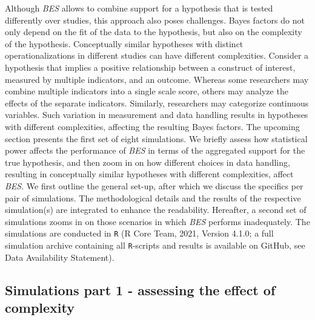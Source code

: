 \documentclass[
]{interact}
\begin{document}
Although \emph{BES} allows to combine support for a hypothesis that is
tested differently over studies, this approach also poses challenges.
Bayes factors do not only depend on the fit of the data to the
hypothesis, but also on the complexity of the hypothesis. Conceptually
similar hypotheses with distinct operationalizations in different
studies can have different complexities. Consider a hypothesis that
implies a positive relationship between a construct of interest,
measured by multiple indicators, and an outcome. Whereas some
researchers may combine multiple indicators into a single scale score,
others may analyze the effects of the separate indicators. Similarly,
researchers may categorize continuous variables. Such variation in
measurement and data handling results in hypotheses with different
complexities, affecting the resulting Bayes factors. The upcoming
section presents the first set of eight simulations. We briefly assess
how statistical power affects the performance of \emph{BES} in terms of
the aggregated support for the true hypothesis, and then zoom in on how
different choices in data handling, resulting in conceptually similar
hypotheses with different complexities, affect \emph{BES}. We first
outline the general set-up, after which we discuss the specifics per
pair of simulations. The methodological details and the results of the
respective simulation(s) are integrated to enhance the readability.
Hereafter, a second set of simulations zooms in on those scenarios in
which \emph{BES} performs inadequately. The simulations are conducted in
\texttt{R} (R Core Team, 2021, Version 4.1.0; a full simulation archive
            containing all \texttt{R}-scripts and results is available on GitHub,
            see Data Availability Statement).

\hypertarget{simulations-part-1---assessing-the-effect-of-complexity}{%
  \subsection{Simulations part 1 - assessing the effect of
    complexity}\label{simulations-part-1---assessing-the-effect-of-complexity}}
\end{document}
